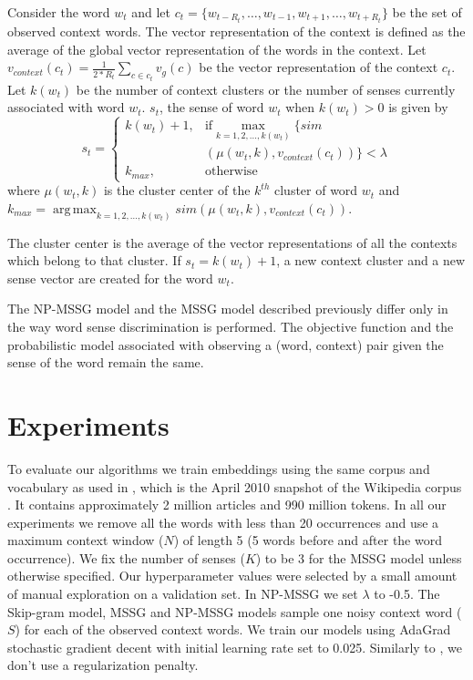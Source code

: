 \documentclass[11pt,a4paper]{article}
\DeclareMathOperator*{\argmax}{arg\,max}
\begin{document}
Consider the word $w_t$ and let $c_t=\{ w_{t-R_{t}}, \ldots, w_{t-1}, w_{t+1}, \ldots, w_{t+R_{t}} \}$ be the set of observed context words. The vector representation of the context is defined as the average of the global vector representation of the words in the context. Let $v_{context}(c_t) = \frac{1}{2*R_{t}} \sum_{c \in c_{t} }v_g(c)$ be the vector representation of the context $c_t$. Let $k(w_t)$ be the  number of context clusters or the number of senses  currently associated with word $w_t$. $s_t$, the sense of word $w_t$ when $k(w_t) > 0$ is given by
\begin{equation}
    s_t =
    \begin{cases}
      k(w_t) + 1,  & \text{if}   \max_{k=1,2,\ldots,k(w_t)} \{  
       sim\\ & ( \mu(w_t, k),  v_{context}(c_t)) \} < \lambda \\
      k_{max}, & \text{otherwise}
    \end{cases}
  \end{equation}
where $\mu(w_t, k)$ is the cluster center of the $k^{th}$ cluster of word $w_t$ and $k_{max} = \argmax_{k=1,2,\ldots,k(w_t)} sim(\mu(w_t, k), v_{context}(c_t))$. 

The cluster center is the average of the vector representations of all the contexts which belong to that cluster. If $s_t = k(w_t) + 1$, a new context cluster and a new sense vector are created for the word $w_t$.
	
The NP-MSSG model and the MSSG model described previously differ only in the way word sense discrimination is performed. The objective function and the probabilistic model associated with observing a (word, context) pair given the sense of the word remain the same.

\section{Experiments}
\label{sec:experiments}

To evaluate our algorithms we train embeddings using the same corpus
and vocabulary as used in , which is the April
2010 snapshot of the Wikipedia corpus \cite{wiki-corpus-2010}.  It
contains approximately 2 million articles and 990 million tokens.  In
all our experiments we remove all the words with less than 20
occurrences and use a maximum context window ($N$) of length 5 (5
words before and after the word occurrence). We fix the number of
senses ($K$) to be 3 for the MSSG model unless otherwise specified.
Our hyperparameter values were selected by a small amount of manual
exploration on a validation set.  In NP-MSSG we set $\lambda$ to -0.5.
The Skip-gram model, MSSG and NP-MSSG models sample one noisy context
word ($S$) for each of the observed context words. We train our models
using AdaGrad stochastic gradient decent \cite{duchi:2011} with
initial learning rate set to 0.025. Similarly to ,
we don't use a regularization penalty.
\end{document}
